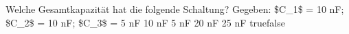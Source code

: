     {Welche Gesamtkapazität hat die folgende Schaltung? Gegeben: \$C\_1\$ = 10 nF; \$C\_2\$ = 10 nF; \$C\_3\$ = 5 nF}
    {10 nF}
    {5 nF}
    {20 nF}
    {25 nF}
    {true}{false}